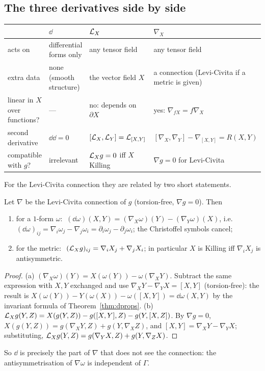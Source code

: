\subsection{The three derivatives side by side}\label{sec:threederivs}

\begin{center}
\small
\renewcommand{\arraystretch}{1.35}
\begin{tabular}{@{}p{2.3cm}p{3.5cm}p{3.7cm}p{4.4cm}@{}}
\toprule
 & $\dd$ & $\mathcal{L}_X$ & $\nabla_X$\\
\midrule
acts on & differential forms only & any tensor field & any tensor field\\
extra data & none (smooth structure) & the vector field $X$ & a connection (Levi-Civita if a metric is given)\\
linear in $X$ over functions? & --- & no: depends on $\partial X$ & yes: $\nabla_{fX}=f\nabla_X$\\
second derivative & $\dd\dd=0$ & $[\mathcal{L}_X,\mathcal{L}_Y]=\mathcal{L}_{[X,Y]}$ & $[\nabla_X,\nabla_Y]-\nabla_{[X,Y]}=R(X,Y)$ \\
compatible with $g$? & irrelevant & $\mathcal{L}_Xg=0$ iff $X$ Killing & $\nabla g=0$ for Levi-Civita\\
\bottomrule
\end{tabular}
\end{center}

For the Levi-Civita connection they are related by two short statements.

\begin{proposition}\label{prop:threederivs}
Let $\nabla$ be the Levi-Civita connection of $g$ (torsion-free, $\nabla g=0$). Then
\begin{enumerate}[label=(\alph*)]
\item for a $1$-form $\omega$: $\ (\dd\omega)(X,Y)=(\nabla_X\omega)(Y)-(\nabla_Y\omega)(X)$, i.e.\ $(\dd\omega)_{ij}=\nabla_i\omega_j-\nabla_j\omega_i=\partial_i\omega_j-\partial_j\omega_i$; the Christoffel symbols cancel;
\item for the metric: $\ (\Lie_Xg)_{ij}=\nabla_iX_j+\nabla_jX_i$; in particular $X$ is Killing iff $\nabla_iX_j$ is antisymmetric.
\end{enumerate}
\end{proposition}
\begin{proof}
(a) $(\nabla_X\omega)(Y)=X(\omega(Y))-\omega(\nabla_XY)$. Subtract the same expression with $X,Y$ exchanged and use $\nabla_XY-\nabla_YX=[X,Y]$ (torsion-free): the result is $X(\omega(Y))-Y(\omega(X))-\omega([X,Y])=\dd\omega(X,Y)$ by the invariant formula of Theorem~\ref{thm:dprops}.
(b) $\mathcal{L}_Xg(Y,Z)=X(g(Y,Z))-g([X,Y],Z)-g(Y,[X,Z])$. By $\nabla g=0$, $X(g(Y,Z))=g(\nabla_XY,Z)+g(Y,\nabla_XZ)$, and $[X,Y]=\nabla_XY-\nabla_YX$; substituting, $\mathcal{L}_Xg(Y,Z)=g(\nabla_YX,Z)+g(Y,\nabla_ZX)$.
\end{proof}

So $\dd$ is precisely the part of $\nabla$ that does not see the connection: the antisymmetrisation of $\nabla\omega$ is independent of $\Gamma$.
